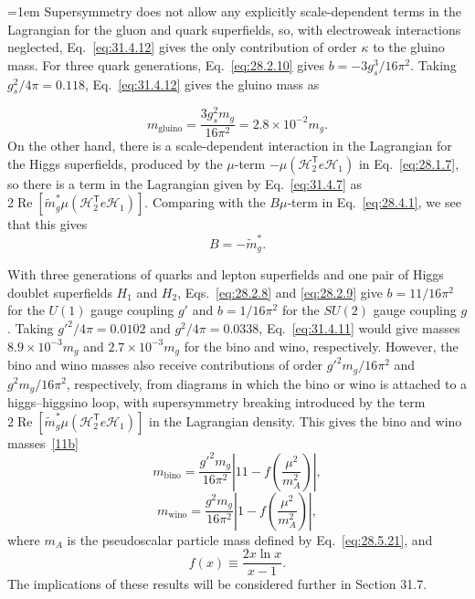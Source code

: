 \begingroup
\emergencystretch=1em
Supersymmetry does not allow any explicitly scale-dependent terms in the
Lagrangian for the gluon and quark superfields, so, with electroweak
interactions neglected, Eq.~\eqref{eq:31.4.12} gives the only contribution
of order \(\kappa\) to the gluino mass. For three quark generations,
Eq.~\eqref{eq:28.2.10} gives \(b=-3g_s^3/16\pi^2\). Taking
\(g_s^2/4\pi=0.118\), Eq.~\eqref{eq:31.4.12} gives the gluino mass as
\par
\endgroup
\begin{equation}
  m_{\mathrm{gluino}}
  =\frac{3g_s^2m_g}{16\pi^2}
  =2.8\times10^{-2}m_g.
  \tag{31.4.13}\label{eq:31.4.13}
\end{equation}
On the other hand, there is a scale-dependent interaction in the
Lagrangian for the Higgs superfields, produced by the \(\mu\)-term
\(-\mu(\mathcal H_2^{\mathsf T}e\mathcal H_1)\) in
Eq.~\eqref{eq:28.1.7}, so there is a term in the Lagrangian given by
Eq.~\eqref{eq:31.4.7} as
\(2\operatorname{Re}
[\widetilde m_g^*\mu(\mathcal H_2^{\mathsf T}e\mathcal H_1)]\).
Comparing with the \(B\mu\)-term in Eq.~\eqref{eq:28.4.1}, we see that
this gives
\begin{equation}
  B=-\widetilde m_g^*.
  \tag{31.4.14}\label{eq:31.4.14}
\end{equation}

With three generations of quarks and lepton superfields and one pair of
Higgs doublet superfields \(H_1\) and \(H_2\),
Eqs.~\eqref{eq:28.2.8} and \eqref{eq:28.2.9} give \(b=11/16\pi^2\) for
the \(U(1)\) gauge coupling \(g'\) and \(b=1/16\pi^2\) for the \(SU(2)\)
gauge coupling \(g\). Taking \(g'^2/4\pi=0.0102\) and
\(g^2/4\pi=0.0338\), Eq.~\eqref{eq:31.4.11} would give masses
\(8.9\times10^{-3}m_g\) and \(2.7\times10^{-3}m_g\) for the bino and
wino, respectively. However, the bino and wino masses also receive
contributions of order \(g'^2m_g/16\pi^2\) and \(g^2m_g/16\pi^2\),
respectively, from diagrams in which the bino or wino is attached to a
higgs--higgsino loop, with supersymmetry breaking introduced by the term
\(2\operatorname{Re}
[\widetilde m_g^*\mu(\mathcal H_2^{\mathsf T}e\mathcal H_1)]\)
in the Lagrangian density. This gives the bino and wino
masses~\hyperref[ch31-ref-11b]{[11b]}
\begin{equation}
  m_{\mathrm{bino}}
  =\frac{g'^2m_g}{16\pi^2}
   \left|11-f\left(\frac{\mu^2}{m_A^2}\right)\right|,
  \tag{31.4.15}\label{eq:31.4.15}
\end{equation}
\begin{equation}
  m_{\mathrm{wino}}
  =\frac{g^2m_g}{16\pi^2}
   \left|1-f\left(\frac{\mu^2}{m_A^2}\right)\right|,
  \tag{31.4.16}\label{eq:31.4.16}
\end{equation}
where \(m_A\) is the pseudoscalar particle mass defined by
Eq.~\eqref{eq:28.5.21}, and
\begin{equation}
  f(x)\equiv\frac{2x\ln x}{x-1}.
  \tag{31.4.17}\label{eq:31.4.17}
\end{equation}
The implications of these results will be considered further in Section
31.7.

